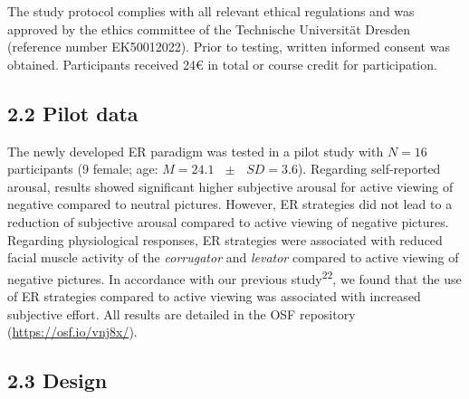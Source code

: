 \documentclass[
  man,floatsintext]{apa6}
\begin{document}
The study protocol complies with all relevant ethical regulations and was approved by the ethics committee of the Technische Universität Dresden (reference number EK50012022).
Prior to testing, written informed consent was obtained.
Participants received 24€ in total or course credit for participation.

\hypertarget{pilot-data}{%
\subsection{2.2 Pilot data}\label{pilot-data}}

The newly developed ER paradigm was tested in a pilot study with \(N=16\) participants (9 female; age: \(M = 24.1\text{ }\pm\text{ }SD = 3.6\)).
Regarding self-reported arousal, results showed significant higher subjective arousal for active viewing of negative compared to neutral pictures.
However, ER strategies did not lead to a reduction of subjective arousal compared to active viewing of negative pictures.
Regarding physiological responses, ER strategies were associated with reduced facial muscle activity of the \emph{corrugator} and \emph{levator} compared to active viewing of negative pictures.
In accordance with our previous study\textsuperscript{22}, we found that the use of ER strategies compared to active viewing was associated with increased subjective effort.
All results are detailed in the OSF repository (\url{https://osf.io/vnj8x/}).

\hypertarget{design}{%
\subsection{2.3 Design}\label{design}}
\end{document}
